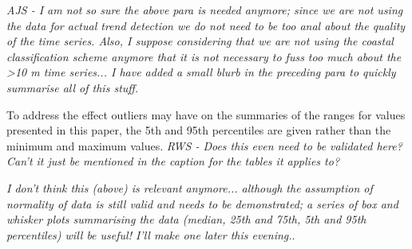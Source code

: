 \documentclass{ametsoc}
\begin{document}
\emph{AJS - I am not so sure the above para is needed anymore; since we are not using the data for actual trend detection we do not need to be too anal about the quality of the time series. Also, I suppose considering that we are not using the coastal classification scheme anymore that it is not necessary to fuss too much about the >10 m time series... I have added a small blurb in the preceding para to quickly summarise all of this stuff.}

To address the effect outliers may have on the summaries of the ranges for values presented in this paper, the 5th and 95th percentiles are given rather than the minimum and maximum values. \emph{RWS - Does this even need to be validated here? Can't it just be mentioned in the caption for the tables it applies to?}

\emph{I don't think this (above) is relevant anymore... although the assumption of normality of data is still valid and needs to be demonstrated; a series of box and whisker plots summarising the data (median, 25th and 75th, 5th and 95th percentiles) will be useful! I'll make one later this evening.}.

\end{document}

